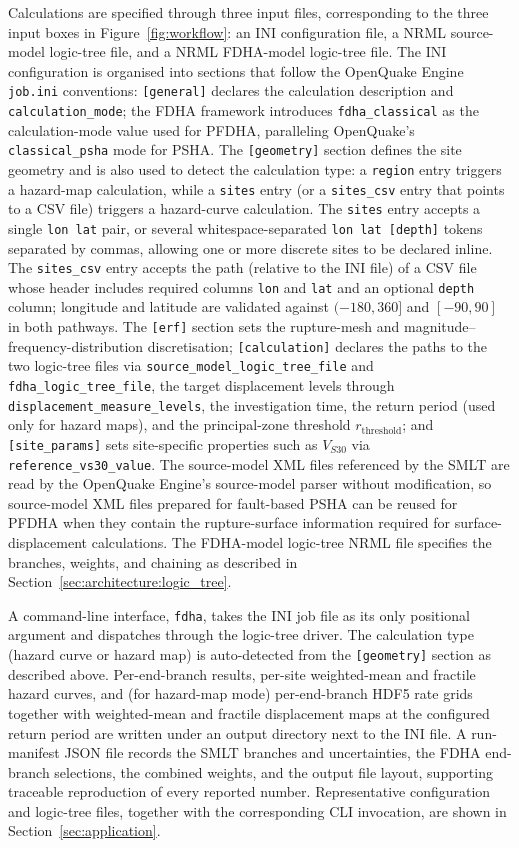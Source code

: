 Calculations are specified through three input files, corresponding to the three input boxes in Figure~\ref{fig:workflow}: an INI configuration file, a NRML source-model logic-tree file, and a NRML FDHA-model logic-tree file. The INI configuration is organised into sections that follow the OpenQuake Engine \texttt{job.ini} conventions: \texttt{[general]} declares the calculation description and \texttt{calculation\_mode}; the FDHA framework introduces \texttt{fdha\_classical} as the calculation-mode value used for PFDHA, paralleling OpenQuake's \texttt{classical\_psha} mode for PSHA. The \texttt{[geometry]} section defines the site geometry and is also used to detect the calculation type: a \texttt{region} entry triggers a hazard-map calculation, while a \texttt{sites} entry (or a \texttt{sites\_csv} entry that points to a CSV file) triggers a hazard-curve calculation. The \texttt{sites} entry accepts a single \texttt{lon~lat} pair, or several whitespace-separated \texttt{lon~lat~[depth]} tokens separated by commas, allowing one or more discrete sites to be declared inline. The \texttt{sites\_csv} entry accepts the path (relative to the INI file) of a CSV file whose header includes required columns \texttt{lon} and \texttt{lat} and an optional \texttt{depth} column; longitude and latitude are validated against $(-180, 360]$ and $[-90, 90]$ in both pathways. The \texttt{[erf]} section sets the rupture-mesh and magnitude--frequency-distribution discretisation; \texttt{[calculation]} declares the paths to the two logic-tree files via \texttt{source\_model\_logic\_tree\_file} and \texttt{fdha\_logic\_tree\_file}, the target displacement levels through \texttt{displacement\_measure\_levels}, the investigation time, the return period (used only for hazard maps), and the principal-zone threshold $r_{\mathrm{threshold}}$; and \texttt{[site\_params]} sets site-specific properties such as $V_{S30}$ via \texttt{reference\_vs30\_value}. The source-model XML files referenced by the SMLT are read by the OpenQuake Engine's source-model parser without modification, so source-model XML files prepared for fault-based PSHA can be reused for PFDHA when they contain the rupture-surface information required for surface-displacement calculations. The FDHA-model logic-tree NRML file specifies the branches, weights, and chaining as described in Section~\ref{sec:architecture:logic_tree}.


A command-line interface, \texttt{fdha}, takes the INI job file as its only positional argument and dispatches through the logic-tree driver. The calculation type (hazard curve or hazard map) is auto-detected from the \texttt{[geometry]} section as described above. Per-end-branch results, per-site weighted-mean and fractile hazard curves, and (for hazard-map mode) per-end-branch HDF5 rate grids together with weighted-mean and fractile displacement maps at the configured return period are written under an output directory next to the INI file. A run-manifest JSON file records the SMLT branches and uncertainties, the FDHA end-branch selections, the combined weights, and the output file layout, supporting traceable reproduction of every reported number. Representative configuration and logic-tree files, together with the corresponding CLI invocation, are shown in Section~\ref{sec:application}.
